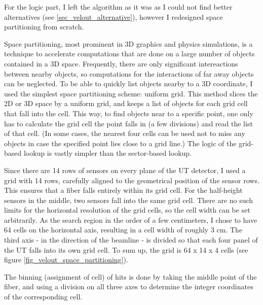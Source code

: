 \documentclass[12pt]{article}
\begin{document}
For the logic part, I left the algorithm as it was as I could not find better alternatives (see \ref{sec_velout_alternative}), however I redesigned space partitioning from scratch.
\vspace{1pc}

Space partitioning, most prominent in 3D graphics and physics simulations, is a technique to accelerate computations that are done on a large number of objects contained in a 3D space. Frequently, there are only significant intereactions between nearby objects, so computations for the interactions of far away objects can be neglected. To be able to quickly list objects nearby to a 3D coordinate, I used the simplest space partitioning scheme: uniform grid. This method slices the 2D or 3D space by a uniform grid, and keeps a list of objects for each grid cell that fall into the cell. This way, to find objects near to a specific point, one only has to calculate the grid cell the point falls in (a few divisions) and read the list of that cell. (In some cases, the nearest four cells can be used not to miss any objects in case the specified point lies close to a grid line.) The logic of the grid-based lookup is vastly simpler than the sector-based lookup.
\vspace{1pc}

Since there are 14  rows of sensors on every plane of the UT detector, I used a grid with 14 rows, carefully aligned to the geometrical position of the sensor rows. This ensures that a fiber falls entirely within its grid cell. For the half-height sensors in the middle, two sensors fall into the same grid cell. There are no such limits for the horizontal resolution of the grid cells, so the cell width can be set arbitrarily. As the search region in the order of a few centimeters, I chose to have 64 cells on the horizontal axis, resulting in a cell width of roughly 3 cm. The third axis - in the direction of the beamline - is divided so that each four panel of the UT falls into its own grid cell. To sum up, the grid is 64 x 14 x 4 cells (see figure \ref{fig_velout_space_partitioning}).

The binning (assignment of cell) of hits is done by taking the middle point of the fiber, and using a division on all three axes to determine the integer coordinates of the corresponding cell.
\end{document}
